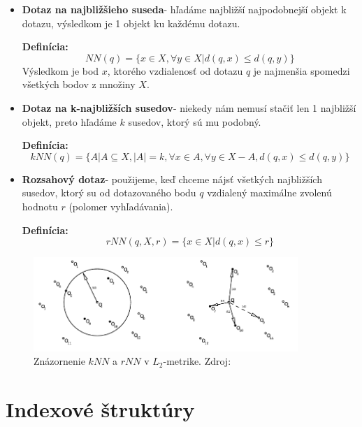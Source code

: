 \documentclass[12pt,a4paper,oneside]{fithesis2}
\begin{document}
   \begin{itemize}
   \item \textbf{Dotaz na najbližšieho suseda}- hľadáme najbližší najpodobnejší objekt k dotazu, výsledkom je 1 objekt ku každému dotazu.
   
   \textbf{Definícia:}
   \begin{equation*}
   NN(q)=\{x \in X, \forall y \in X| d(q,x)\leq d(q,y) \}
   \end{equation*}
Výsledkom je bod $x$, ktorého vzdialenosť od dotazu $q$ je najmenšia spomedzi všetkých bodov z množiny $X$.
   \item \textbf{Dotaz na k-najbližších susedov}- niekedy nám nemusí stačiť len 1 najbližší objekt, preto hľadáme $k$ susedov, ktorý sú mu podobný.
   
   \textbf{Definícia:}
   \begin{equation*}
   kNN(q)=\{A|A \subseteq X,|A|=k,\forall x \in A,\forall y \in X - A,d(q,x)\leq d(q,y)\}
   \end{equation*}    
   \item \textbf{Rozsahový dotaz}- použijeme, keď chceme nájsť všetkých najbližších susedov, ktorý su od dotazovaného bodu $q$ vzdialený maximálne zvolenú hodnotu $r$ (polomer vyhľadávania).
   
   \textbf{Definícia:} %
   \begin{equation*} 
  rNN(q,X,r)=\{ x \in X|d(q,x)\leq r \}
   \end{equation*}  
   \end{itemize}
   
	\begin{figure}[h]
  		\centering
  		\includegraphics[width=10cm]{obr/knn.png}
  		\caption{Znázornenie $kNN$ a $rNN$ v $L_2$-metrike. Zdroj:\cite{knnPavelJurkas}}
  		\label{fig:rozdelenie priestoru}
	\end{figure}  

\section{Indexové štruktúry}
\end{document}
